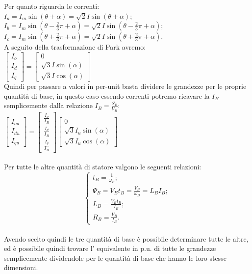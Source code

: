 \documentclass[Lau,noexaminfo]{sapthesis}
\begin{document}
	 Per quanto riguarda le correnti:\\
	 $I_a=I_m\sin(\theta+\alpha)=\sqrt{2}I\sin(\theta+\alpha)$;\\
	 $I_b=I_m\sin(\theta-\frac{2}{3}\pi+\alpha)=\sqrt{2}I\sin(\theta-\frac{2}{3}\pi+\alpha)$;\\
	 $I_c=I_m\sin(\theta+\frac{2}{3}\pi+\alpha)=\sqrt{2}I\sin(\theta+\frac{2}{3}\pi+\alpha)$.\\
	 A seguito della trasformazione di Park avremo:\\
	 $\begin{bmatrix}
	 I_o\\
	 I_d\\
	 I_q
	 \end{bmatrix}=
	 \begin{bmatrix}
	 0\\
	 \sqrt{3}I\sin(\alpha)\\
	 \sqrt{3}I\cos(\alpha)
	 \end{bmatrix}$\\
	 Quindi per passare a valori in per-unit basta dividere le grandezze per le proprie quantità di base, in questo caso essendo correnti potremo ricavare la $I_B$ semplicemente dalla relazione $I_B=\frac{S_B}{V_B}$:\\
	 $\begin{bmatrix}
	 I_{ou}\\
	 I_{du}\\
	 I_{qu}
	 \end{bmatrix}=
	 \begin{bmatrix}
	 \frac{I_{o}}{I_B}\\
	 \frac{I_{d}}{I_B}\\
	 \frac{I_{q}}{I_B}
	 \end{bmatrix}
	 \begin{bmatrix}
	 0\\
	 \sqrt{3}I_u\sin(\alpha)\\
	 \sqrt{3}I_u\cos(\alpha)
	 \end{bmatrix}$\\\\
	 Per tutte le altre quantità di statore valgono le seguenti relazioni:\\
	 \begin{equation}
	 \begin{cases}
	 t_B=\frac{1}{\omega_B};\\
	 \Psi_B=V_B t_B=\frac{V_B}{\omega_B}=L_B I_B;\\
	 L_B=\frac{V_B t_B}{I_B};\\
	 R_B=\frac{V_B}{I_B}.
	 \end{cases}
	 \end{equation}\\
	 Avendo scelto quindi le tre quantità di base è possibile determinare tutte le altre, ed è possibile quindi trovare l' equivalente in p.u. di tutte le grandezze semplicemente dividendole per le quantità di base che hanno le loro stesse dimensioni.
\end{document}
